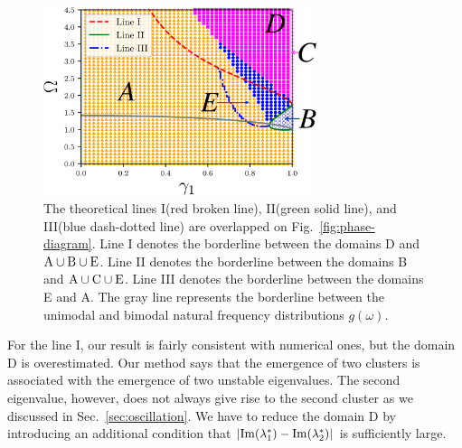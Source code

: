 \begin{figure}[htbp]
\begin{center}
  \includegraphics[width=8cm]{figs/pd-aa.eps}
\end{center}
\caption{
    The theoretical lines I(red broken line),
    II(green solid line), and III(blue dash-dotted line) are overlapped
    on Fig.~\ref{fig:phase-diagram}.
    Line I denotes the borderline between %
    the domains D and ${\rm A}\cup{\rm B}\cup{\rm E}$.
    Line II denotes the borderline between %
    the domains B and ${\rm A}\cup{\rm C}\cup{\rm E}$.
    Line III denotes the borderline between %
    the domains E and A.
    The gray line represents the borderline between the unimodal and bimodal natural frequency distributions $g(\omega)$.
  }
  \label{fig:pd-aa}
\end{figure}



For the line I, our result is fairly consistent with numerical ones,
but the domain D is overestimated.
Our method says that
the emergence of two clusters is associated with 
the emergence of two unstable eigenvalues.
The second eigenvalue, however, does not always
  give rise to the second cluster as we discussed
  in Sec.~\ref{sec:oscillation}.
We have to reduce the domain D by introducing
an additional condition that
$|{\rm Im}(\lambda_{1}^{\ast})-{\rm Im}(\lambda_{2}^{\ast})|$
is sufficiently large.

